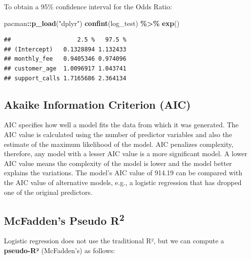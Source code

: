 \documentclass[
]{article}
\newenvironment{Shaded}{\begin{snugshade}}{\end{snugshade}}
\newcommand{\DecValTok}[1]{\textcolor[rgb]{0.00,0.00,0.81}{#1}}
\newcommand{\FunctionTok}[1]{\textcolor[rgb]{0.13,0.29,0.53}{\textbf{#1}}}
\newcommand{\NormalTok}[1]{#1}
\newcommand{\OtherTok}[1]{\textcolor[rgb]{0.56,0.35,0.01}{#1}}
\newcommand{\SpecialCharTok}[1]{\textcolor[rgb]{0.81,0.36,0.00}{\textbf{#1}}}
\newcommand{\StringTok}[1]{\textcolor[rgb]{0.31,0.60,0.02}{#1}}
\begin{document}
To obtain a 95\% confidence interval for the Odds Ratio:

\begin{Shaded}
\begin{Highlighting}[]
\NormalTok{pacman}\SpecialCharTok{::}\FunctionTok{p\_load}\NormalTok{(}\StringTok{"dplyr"}\NormalTok{)}
\FunctionTok{confint}\NormalTok{(log\_test) }\SpecialCharTok{\%\textgreater{}\%} \FunctionTok{exp}\NormalTok{()}
\end{Highlighting}
\end{Shaded}

\begin{verbatim}
##                   2.5 %   97.5 %
## (Intercept)   0.1328894 1.132433
## monthly_fee   0.9405346 0.974096
## customer_age  1.0096917 1.043741
## support_calls 1.7165686 2.364134
\end{verbatim}

\subsection{Akaike Information Criterion
(AIC)}\label{akaike-information-criterion-aic}

AIC specifies how well a model fits the data from which it was
generated. The AIC value is calculated using the number of predictor
variables and also the estimate of the maximum likelihood of the model.
AIC penalizes complexity, therefore, any model with a lesser AIC value
is a more significant model. A lower AIC value means the complexity of
the model is lower and the model better explains the variations. The
model's AIC value of 914.19 can be compared with the AIC value of
alternative models, e.g., a logistic regression that has dropped one of
the original predictors.

\subsection{\texorpdfstring{McFadden's Pseudo
R\textsuperscript{2}}{McFadden's Pseudo R2}}\label{mcfaddens-pseudo-r2}

Logistic regression does not use the traditional R², but we can compute
a \textbf{pseudo-R²} (McFadden's) as follows:

\begin{Shaded}
\end{Shaded}
\end{document}
